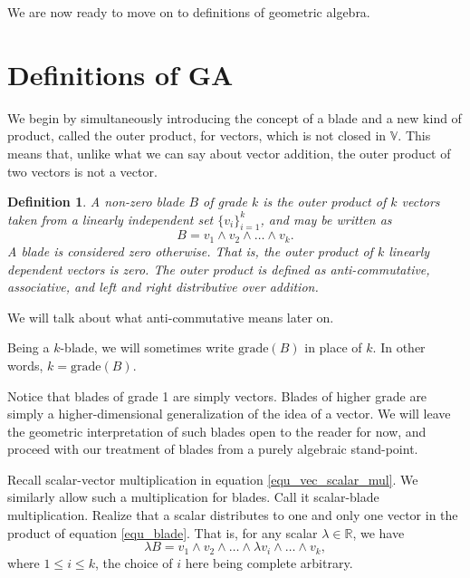 \documentclass[12pt]{article}
\numberwithin{equation}{section}
\newcommand{\V}{\mathbb{V}}
\newcommand{\R}{\mathbb{R}}
\newcommand{\grade}{\mbox{grade}}
\newtheorem{definition}{Definition}[section]
\begin{document}
We are now ready to move on to definitions of geometric algebra.

\section{Definitions of GA}

We begin by simultaneously introducing the concept of a blade and a new kind of
product, called the outer product, for vectors, which is not closed in $\V$.  This means
that, unlike what we can say about vector addition, the outer product of two vectors is not a vector.
\begin{definition}\label{def_blade}
A non-zero blade $B$ of grade $k$ is the outer product of $k$ vectors taken
from a linearly independent set $\{v_i\}_{i=1}^k$, and may be written as
\begin{equation}\label{equ_blade}
B = v_1\wedge v_2\wedge\dots\wedge v_k.
\end{equation}
A blade is considered zero otherwise.  That is, the outer product of $k$
linearly dependent vectors is zero.  The outer product is defined as
anti-commutative, associative, and left and right distributive over addition.
\end{definition}

We will talk about what anti-commutative means later on.

Being a $k$-blade,
we will sometimes write $\grade(B)$ in place of $k$.  In other words, $k=\grade(B)$.

Notice that blades of grade 1 are simply vectors.  Blades of higher grade are simply
a higher-dimensional generalization of the idea of a vector.  We will leave the geometric
interpretation of such blades open to the reader for now, and proceed with our treatment of
blades from a purely algebraic stand-point.

Recall scalar-vector multiplication in equation \eqref{equ_vec_scalar_mul}.
We similarly allow such a multiplication for blades.  Call it scalar-blade multiplication.
Realize that a scalar distributes to one and only one vector in the product of
equation \eqref{equ_blade}.  That is, for any scalar $\lambda\in\R$,
we have
\begin{equation}
\lambda B = v_1\wedge v_2\wedge\dots\wedge \lambda v_i\wedge\dots\wedge v_k,
\end{equation}
where $1\leq i\leq k$, the choice of $i$ here being complete arbitrary.
\end{document}
